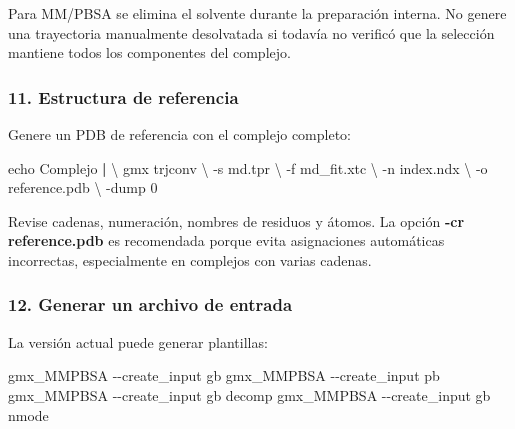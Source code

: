 \documentclass[
  spanish,
  11pt,
  a4paper]{article}
\newenvironment{Shaded}{\begin{snugshade}}{\end{snugshade}}
\newcommand{\AttributeTok}[1]{\textcolor[rgb]{0.13,0.29,0.53}{#1}}
\newcommand{\BuiltInTok}[1]{#1}
\newcommand{\DataTypeTok}[1]{\textcolor[rgb]{0.13,0.29,0.53}{#1}}
\newcommand{\ExtensionTok}[1]{#1}
\newcommand{\KeywordTok}[1]{\textcolor[rgb]{0.13,0.29,0.53}{\textbf{#1}}}
\newcommand{\NormalTok}[1]{#1}
\begin{document}
Para MM/PBSA se elimina el solvente durante la preparación interna. No
genere una trayectoria manualmente desolvatada si todavía no verificó
que la selección mantiene todos los componentes del complejo.

\subsubsection{11. Estructura de
referencia}\label{estructura-de-referencia}

Genere un PDB de referencia con el complejo completo:

\begin{Shaded}
\begin{Highlighting}[]
\BuiltInTok{echo}\NormalTok{ Complejo }\KeywordTok{|} \DataTypeTok{\textbackslash{}}
\ExtensionTok{gmx}\NormalTok{ trjconv }\DataTypeTok{\textbackslash{}}
    \AttributeTok{{-}s}\NormalTok{ md.tpr }\DataTypeTok{\textbackslash{}}
    \AttributeTok{{-}f}\NormalTok{ md\_fit.xtc }\DataTypeTok{\textbackslash{}}
    \AttributeTok{{-}n}\NormalTok{ index.ndx }\DataTypeTok{\textbackslash{}}
    \AttributeTok{{-}o}\NormalTok{ reference.pdb }\DataTypeTok{\textbackslash{}}
    \AttributeTok{{-}dump}\NormalTok{ 0}
\end{Highlighting}
\end{Shaded}

Revise cadenas, numeración, nombres de residuos y átomos. La opción
\textbf{-cr reference.pdb} es recomendada porque evita asignaciones
automáticas incorrectas, especialmente en complejos con varias cadenas.

\subsubsection{12. Generar un archivo de
entrada}\label{generar-un-archivo-de-entrada}

La versión actual puede generar plantillas:

\begin{Shaded}
\begin{Highlighting}[]
\ExtensionTok{gmx\_MMPBSA} \AttributeTok{{-}{-}create\_input}\NormalTok{ gb}
\ExtensionTok{gmx\_MMPBSA} \AttributeTok{{-}{-}create\_input}\NormalTok{ pb}
\ExtensionTok{gmx\_MMPBSA} \AttributeTok{{-}{-}create\_input}\NormalTok{ gb decomp}
\ExtensionTok{gmx\_MMPBSA} \AttributeTok{{-}{-}create\_input}\NormalTok{ gb nmode}
\end{Highlighting}
\end{Shaded}
\end{document}
